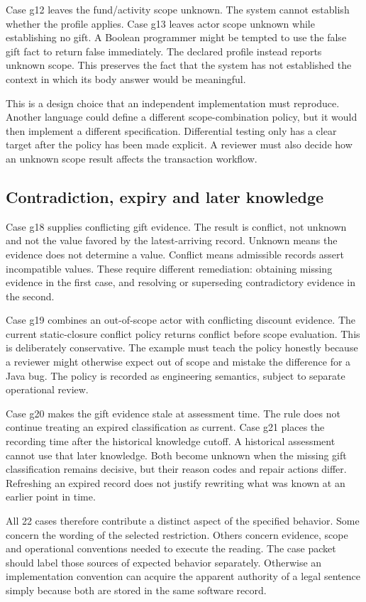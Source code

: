 \documentclass[12pt,a4paper,oneside,openany]{book}
\begin{document}
Case g12 leaves the fund/activity scope unknown. The system cannot establish
whether the profile applies. Case g13 leaves actor scope unknown while
establishing no gift. A Boolean programmer might be tempted to use the false
gift fact to return false immediately. The declared profile instead reports
unknown scope. This preserves the fact that the system has not established the
context in which its body answer would be meaningful.

This is a design choice that an independent implementation must reproduce.
Another language could define a different scope-combination policy, but it
would then implement a different specification. Differential testing only has
a clear target after the policy has been made explicit. A reviewer must also
decide how an unknown scope result affects the transaction workflow.

\subsection{Contradiction, expiry and later knowledge}
Case g18 supplies conflicting gift evidence. The result is conflict, not
unknown and not the value favored by the latest-arriving record. Unknown means
the evidence does not determine a value. Conflict means admissible records
assert incompatible values. These require different remediation: obtaining
missing evidence in the first case, and resolving or superseding contradictory
evidence in the second.

Case g19 combines an out-of-scope actor with conflicting discount evidence.
The current static-closure conflict policy returns conflict before scope
evaluation. This is deliberately conservative. The example must teach the
policy honestly because a reviewer might otherwise expect out of scope and
mistake the difference for a Java bug. The policy is recorded as engineering
semantics, subject to separate operational review.

Case g20 makes the gift evidence stale at assessment time. The rule does not
continue treating an expired classification as current. Case g21 places the
recording time after the historical knowledge cutoff. A historical assessment
cannot use that later knowledge. Both become unknown when the missing gift
classification remains decisive, but their reason codes and repair actions
differ. Refreshing an expired record does not justify rewriting what was known
at an earlier point in time.

All 22 cases therefore contribute a distinct aspect of the specified behavior.
Some concern the wording of the selected restriction. Others concern evidence,
scope and operational conventions needed to execute the reading. The case
packet should label those sources of expected behavior separately. Otherwise
an implementation convention can acquire the apparent authority of a legal
sentence simply because both are stored in the same software record.
\end{document}
